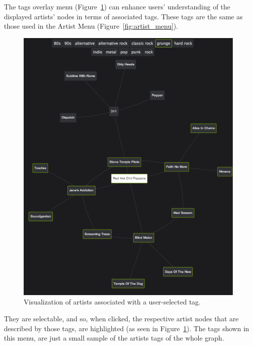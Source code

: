 \documentclass{article}
\begin{document}
      The tags overlay menu (Figure~\ref{fig:tags_overlay}) can enhance users' understanding of the displayed artists' nodes in terms of associated tags. These tags are the same as those used in the Artist Menu (Figure~\ref{fig:artist_menu}).
      \begin{figure}[hb]
        \begin{center}
          \includegraphics[width=\columnwidth]{../report/figures/tags_overlay.pdf}
        \end{center}
        \caption{Visualization of artists associated with a user-selected tag.}
        \label{fig:tags_overlay}
      \end{figure}
      They are selectable, and so, when clicked, the respective artist nodes that are described by those tags, are highlighted (as seen in Figure~\ref{fig:tags_overlay}).
      The tags shown in this menu, are just a small sample of the artists tags of the whole graph.


% 

\end{document}
